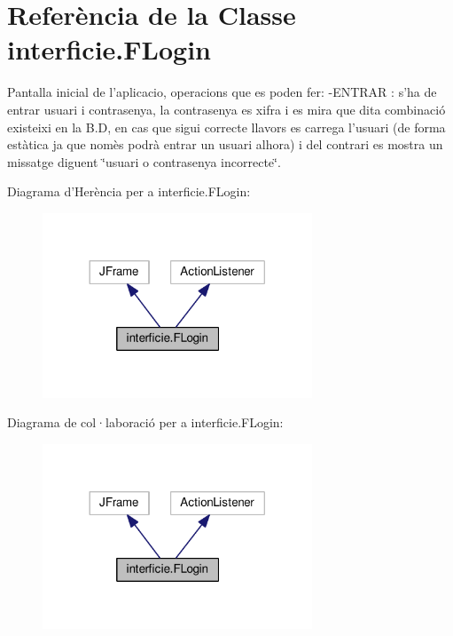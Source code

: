 \hypertarget{classinterficie_1_1_f_login}{\section{Referència de la Classe interficie.\+F\+Login}
\label{classinterficie_1_1_f_login}
}


Pantalla inicial de l'aplicacio, operacions que es poden fer\+: -\/\+E\+N\+T\+R\+A\+R \+: s'ha de entrar usuari i contrasenya, la contrasenya es xifra i es mira que dita combinació existeixi en la B.\+D, en cas que sigui correcte llavors es carrega l'usuari (de forma estàtica ja que nomès podrà entrar un usuari alhora) i del contrari es mostra un missatge diguent \char`\"{}usuari o contrasenya incorrecte\char`\"{}.  




Diagrama d'Herència per a interficie.\+F\+Login\+:\nopagebreak
\begin{figure}[H]
\begin{center}
\leavevmode
\includegraphics[width=228pt]{classinterficie_1_1_f_login__inherit__graph}
\end{center}
\end{figure}


Diagrama de col·laboració per a interficie.\+F\+Login\+:\nopagebreak
\begin{figure}[H]
\begin{center}
\leavevmode
\includegraphics[width=228pt]{classinterficie_1_1_f_login__coll__graph}
\end{center}
\end{figure}
